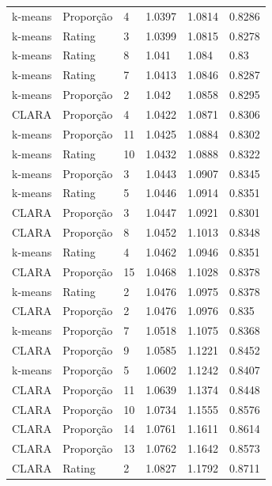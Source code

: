 \documentclass[12pt,a4paper,header]{abnt}
\begin{document}
\begin{longtable}{l|l|l|l|l|l}
k-means   & Proporção      & 4         & 1.0397 & 1.0814 & 0.8286 \\
k-means   & Rating         & 3         & 1.0399 & 1.0815 & 0.8278 \\
k-means   & Rating         & 8         & 1.041  & 1.084  & 0.83   \\
k-means   & Rating         & 7         & 1.0413 & 1.0846 & 0.8287 \\
k-means   & Proporção      & 2         & 1.042  & 1.0858 & 0.8295 \\
CLARA    & Proporção      & 4         & 1.0422 & 1.0871 & 0.8306 \\
k-means   & Proporção      & 11        & 1.0425 & 1.0884 & 0.8302 \\
k-means   & Rating         & 10        & 1.0432 & 1.0888 & 0.8322 \\
k-means   & Proporção      & 3         & 1.0443 & 1.0907 & 0.8345 \\
k-means   & Rating         & 5         & 1.0446 & 1.0914 & 0.8351 \\
CLARA    & Proporção      & 3         & 1.0447 & 1.0921 & 0.8301 \\
CLARA    & Proporção      & 8         & 1.0452 & 1.1013 & 0.8348 \\
k-means   & Rating         & 4         & 1.0462 & 1.0946 & 0.8351 \\
CLARA    & Proporção      & 15        & 1.0468 & 1.1028 & 0.8378 \\
k-means   & Rating         & 2         & 1.0476 & 1.0975 & 0.8378 \\
CLARA    & Proporção      & 2         & 1.0476 & 1.0976 & 0.835  \\
k-means   & Proporção      & 7         & 1.0518 & 1.1075 & 0.8368 \\
CLARA    & Proporção      & 9         & 1.0585 & 1.1221 & 0.8452 \\
k-means   & Proporção      & 5         & 1.0602 & 1.1242 & 0.8407 \\
CLARA    & Proporção      & 11        & 1.0639 & 1.1374 & 0.8448 \\
CLARA    & Proporção      & 10        & 1.0734 & 1.1555 & 0.8576 \\
CLARA    & Proporção      & 14        & 1.0761 & 1.1611 & 0.8614 \\
CLARA    & Proporção      & 13        & 1.0762 & 1.1642 & 0.8573 \\
CLARA    & Rating         & 2         & 1.0827 & 1.1792 & 0.8711 \\

\end{longtable}
\end{document}

